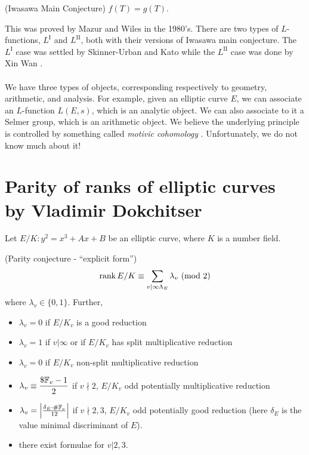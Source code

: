 \documentclass[12pt,amsfont]{amsart}
\begin{document}
\begin{cnj} (Iwasawa Main Conjecture) $f(T) = g(T)$.
\end{cnj}

This was proved by Mazur and Wiles  in the 1980's. There are two types of $L$-functions, $L^{\text{I}}$ and $L^{\text{II}}$, both with their versions of Iwasawa main conjecture. The $L^{\text{I}}$ case was settled by Skinner-Urban  and Kato  while the $L^{\text{II}}$ case was done by Xin Wan . \\ \\
We have three types of objects, corresponding respectively to geometry, arithmetic, and analysis. For example, given an elliptic curve $E$, we can associate an $L$-function $L(E,s)$, which is an analytic object. We can also associate to it a Selmer group, which is an arithmetic object. We believe the underlying principle is controlled by something called \emph{motivic cohomology} . Unfortunately, we do not know much about it! 
\renewcommand{\thesubsection}{\arabic{section}.R}
\begingroup
\renewcommand{\addcontentsline}[3]{}%
\endgroup

\newpage
\section{Parity of ranks of elliptic curves\\ by Vladimir Dokchitser}\label{18}
\renewcommand{\thesubsection}{\arabic{section}.\arabic{subsection}}


Let $E/K: y^2 = x^3 + Ax + B$ be an elliptic curve, where $K$ is a number field. 

\begin{cnj} (Parity conjecture - ``explicit form'') 
\[\rank E/K \equiv \sum_{v | \infty \Lambda_E} \lambda_v\pmod{2}\]
where $\lambda_v \in \{0,1\}$. Further, 
\begin{itemize}
\item
$\lambda_v = 0$ if $E/K_v$ is a good reduction 
\item
$\lambda_v = 1$ if $v | \infty$ or if $E/K_v$ has split multiplicative reduction
\item
$\lambda_v = 0$ if $E/K_v$ non-split multiplicative reduction 
\item
$\displaystyle \lambda_v \equiv \frac{\$ {\mathbb F}_v - 1}{2}$ if $v \nmid 2$, $E/K_v$ odd potentially multiplicative reduction 
\item
$\lambda_v = \left \lvert \frac{ \delta_E \cdot \# {\mathbb F}_v}{12} \right \rvert$ if $v \nmid 2,3$, $E/K_v$ odd potentially good reduction (here $\delta_E$ is the value minimal discriminant of $E$).
\item
there exist formulae for $v | 2,3$.
\end{itemize}
\end{cnj}
\end{document}
